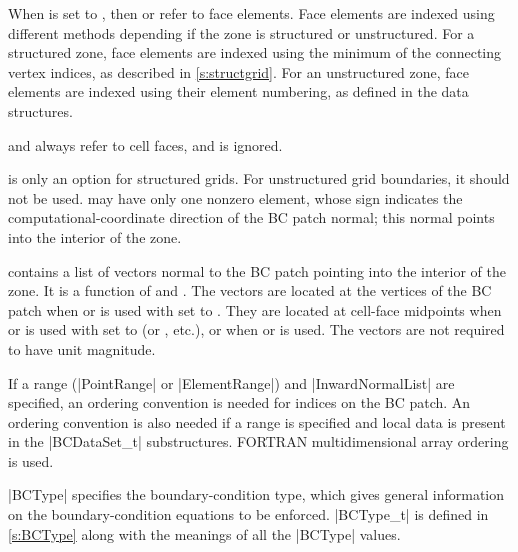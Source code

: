 \begin{notes}
      \vspace{0.5\baselineskip}
      When  is set to , then
       or  refer to face elements.
      Face elements are indexed using different methods depending if the zone
      is structured or unstructured.
      For a structured zone, face elements are indexed using the minimum of
      the connecting vertex indices, as described in \autoref{s:structgrid}.
      For an unstructured zone, face elements are indexed using their element
      numbering, as defined in the  data structures.
\item {} and  always refer to
      cell faces, and  is ignored.
\item {} is only an option for structured grids.
      For unstructured grid boundaries, it should not be used.
       may have only one nonzero element, whose sign
      indicates the computational-coordinate direction of the BC patch normal;
      this normal points into the interior of the zone.
\item {} contains a list of vectors normal to the BC patch
      pointing into the interior of the zone.
      It is a function of  and .
      The vectors are located at the vertices of the BC patch when
       or  is used with
       set to .
      They are located at cell-face midpoints when 
      or  is used with  set to
       (or , etc.), or when
       or  is used.
      The vectors are not required to have unit magnitude.
\item If a range (|PointRange| or |ElementRange|) and |InwardNormalList|
      are specified, an ordering convention is needed for indices on the
      BC patch.
      An ordering convention is also needed if a range is specified and
      local data is present in the |BCDataSet_t| substructures.
      FORTRAN multidimensional array ordering is used.
\end{notes}

|BCType| specifies the boundary-condition type, which gives general
information on the boundary-condition equations to be enforced.
|BCType_t| is defined in \autoref{s:BCType} along with the meanings of
all the |BCType| values.

